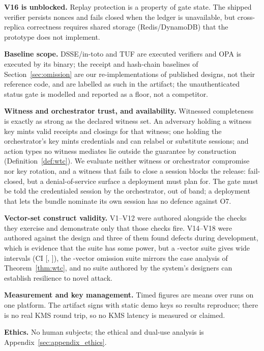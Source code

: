 \documentclass[letterpaper,10pt,twocolumn]{article}
\theoremstyle{definition}
\begin{document}
\textbf{V16 is unblocked.} Replay protection is a property of gate state. The shipped verifier persists nonces and fails closed when the ledger is unavailable, but cross-replica correctness requires shared storage (Redis/DynamoDB) that the prototype does not implement.

\textbf{Baseline scope.} DSSE/in-toto and TUF are executed verifiers and OPA is executed by its binary; the receipt and hash-chain baselines of Section~\ref{sec:omission} are our re-implementations of published designs, not their reference code, and are labelled as such in the artifact; the unauthenticated status gate is modelled and reported as a floor, not a competitor.

\textbf{Witness and orchestrator trust, and availability.} Witnessed completeness is exactly as strong as the declared witness set. An adversary holding a witness key mints valid receipts and closings for that witness; one holding the orchestrator's key mints credentials and can relabel or substitute sessions; and action types no witness mediates lie outside the guarantee by construction (Definition~\ref{def:wtc}). We evaluate neither witness or orchestrator compromise nor key rotation, and a witness that fails to close a session blocks the release: fail-closed, but a denial-of-service surface a deployment must plan for. The gate must be told the credentialed session by the orchestrator, out of band; a deployment that lets the bundle nominate its own session has no defence against O7.

\textbf{Vector-set construct validity.} V1--V12 were authored alongside the checks they exercise and demonstrate only that those checks fire. V14--V18 were authored against the design and three of them found defects during development, which is evidence that the suite has some power, but a \eviTotal{}-vector suite gives wide intervals (CI [\eviCIlo, \eviCIhi]), the \omVectors{}-vector omission suite mirrors the case analysis of Theorem~\ref{thm:wtc}, and no suite authored by the system's designers can establish resilience to novel attack.

\textbf{Measurement and key management.} Timed figures are means over \benchRepeats{} runs on one platform. The artifact signs with static demo keys so results reproduce; there is no real KMS round trip, so no KMS latency is measured or claimed.



\textbf{Ethics.} No human subjects; the ethical and dual-use analysis is Appendix~\ref{sec:appendix_ethics}.
\end{document}
